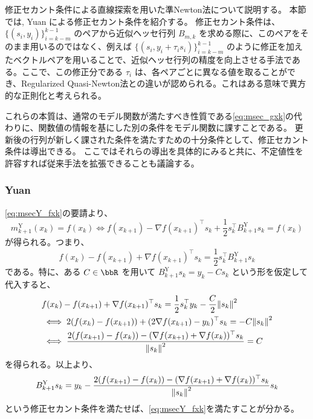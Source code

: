 \documentclass[a4paper, 10pt, dvipdfmx,draft]{article}
\begin{document}
修正セカント条件による直線探索を用いた準Newton法について説明する。
本節では, Yuan による修正セカント条件を紹介する。
修正セカント条件は、$\{(s_i,y_i)\}_{i=k-m}^{k-1}$ のペアから近似ヘッセ行列 $B_{m,k}$ を求める際に、このペアをそのまま用いるのではなく、例えば $\{(s_i,y_i+\tau_i s_i)\}_{i=k-m}^{k-1}$ のように修正を加えたベクトルペアを用いることで、近似ヘッセ行列の精度を向上させる手法である。ここで、この修正分である $\tau_i$ は、各ペアごとに異なる値を取ることができ、Regularized Quasi-Newton法との違いが認められる。これはある意味で異方的な正則化と考えられる。

これらの本質は、通常のモデル関数が満たすべき性質である\cref{eq:msec_gxk}の代わりに、関数値の情報を基にした別の条件をモデル関数に課すことである。
更新後の行列が新しく課された条件を満たすための十分条件として、修正セカント条件は導出できる。
ここではそれらの導出を具体的にみると共に、不定値性を許容すれば従来手法を拡張できることも議論する。

\subsubsection{Yuan}

\cref{eq:msecY_fxk}の要請より、
\begin{equation*}
    m^\mathrm{Y}_{k+1}(x_k) = f(x_k)
    \iff f(x_{k+1}) - \nabla f(x_{k+1})^\top s_k + \frac12 s_k^\top B^\mathrm{Y}_{k+1} s_k = f(x_k)
\end{equation*}
が得られる。つまり、
\begin{equation*}
    f(x_k) - f(x_{k+1}) + \nabla f(x_{k+1})^\top s_k = \frac12 s_k^\top B^\mathrm{Y}_{k+1} s_k
\end{equation*}
である。特に、ある $C\in \bbR$ を用いて $B^\mathrm{Y}_{k+1} s_k = y_k - C s_k$ という形を仮定して代入すると、
\begin{align*}
     & f(x_k) - f(x_{k+1}) + \nabla f(x_{k+1})^\top s_k = \frac12 s_k^\top y_k - \frac{C}{2} \norm{s_k}^2 \\
     & \iff 2(f(x_k) - f(x_{k+1})) + (2\nabla f(x_{k+1})-y_k)^\top s_k = - C \norm{s_k}^2                 \\
     & \iff \frac{2(f(x_{k+1}) - f(x_k)) - (\nabla f(x_{k+1})+\nabla f(x_k))^\top s_k}{\norm{s_k}^2} = C
\end{align*}
を得られる。以上より、
\begin{equation*}
    B^\mathrm{Y}_{k+1} s_k = y_k - \frac{2(f(x_{k+1}) - f(x_k)) - (\nabla f(x_{k+1})+\nabla f(x_k))^\top s_k}{\norm{s_k}^2} s_k
\end{equation*}
という修正セカント条件を満たせば、\cref{eq:msecY_fxk}を満たすことが分かる。
\end{document}
